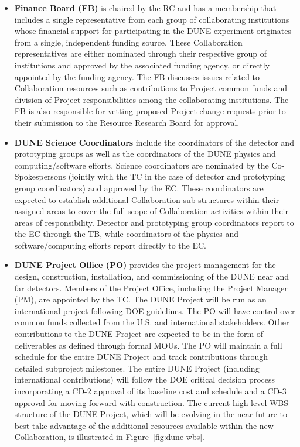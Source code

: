 \begin{itemize}
\item \textbf{Finance Board (FB)} is chaired by the RC and has a membership that includes a single representative from each group of collaborating institutions whose financial support for participating in the DUNE experiment originates from a single, independent funding source.  These Collaboration representatives are either nominated through their respective group of institutions and approved by the associated funding agency, or directly appointed by the funding agency.  The FB discusses issues related to Collaboration resources such as contributions to Project common funds and division of Project responsibilities among the collaborating institutions.  The FB is also responsible for vetting proposed Project change requests prior to their submission to the Resource Research Board for approval.
\item \textbf{DUNE Science Coordinators} include the coordinators of the detector and prototyping groups as well as the coordinators of the DUNE physics and computing/software efforts.  Science coordinators are nominated by the Co-Spokespersons (jointly with the TC in the case of detector and prototyping group coordinators) and approved by the EC.  These coordinators are expected to establish additional Collaboration sub-structures within their assigned areas to cover the full scope of Collaboration activities within their areas of responsibility.  Detector and prototyping group coordinators report to the EC through the TB, while coordinators of the physics and software/computing efforts report directly to the EC.

\item \textbf{DUNE Project Office (PO)} provides the project management for the design, construction, installation, and commissioning of the DUNE near and far detectors.  Members of the Project Office, including the Project Manager (PM), are appointed by the  TC.  The DUNE Project will be run as an international project following DOE guidelines.  The PO will have control over common funds collected from the U.S. and international stakeholders.  Other contributions to the DUNE Project are expected to be in the form of deliverables as defined through formal MOUs. The PO will maintain a full schedule for the entire DUNE Project and track contributions through detailed subproject milestones.  The entire DUNE Project (including international contributions) will follow the DOE critical decision process incorporating a CD-2 approval of its baseline cost and schedule and a CD-3 approval for moving forward with construction.  The current high-level WBS structure of the DUNE Project, which will be evolving in the near future to best take advantage of the additional resources available within the new Collaboration, is illustrated in Figure~\ref{fig:dune-wbs}.


\end{itemize}
